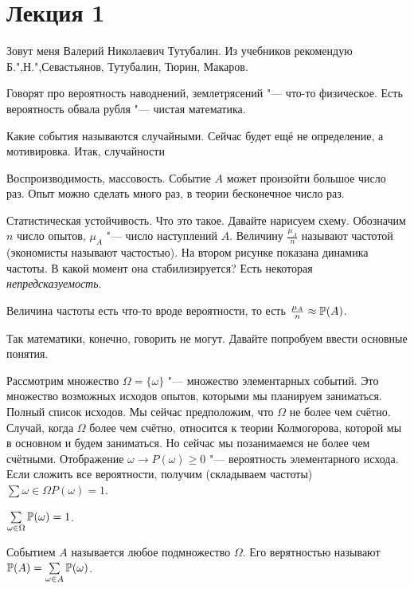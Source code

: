\section{Лекция 1}

Зовут меня Валерий Николаевич Тутубалин. Из учебников рекомендую Б.",Н.",Севастьянов, Тутубалин, Тюрин, Макаров.

Говорят про вероятность наводнений, землетрясений "--- что-то физическое. Есть вероятность обвала рубля "--- чистая математика.

Какие события называются случайными. Сейчас будет ещё не определение, а мотивировка. Итак, случайности
\begin{roItems}
\item Воспроизводимость, массовость. Событие $A$ может произойти большое число раз. Опыт можно сделать много раз, в теории бесконечное число раз.
\item Статистическая устойчивость. Что это такое. Давайте нарисуем схему.
Обозначим $n$ число опытов, $\mu_A$ "--- число наступлений $A$. Величину $\frac{\mu_A}n$ называют частотой (экономисты называют частостью).
На втором рисунке показана динамика частоты. В какой момент она стабилизируется? Есть некоторая \textit{непредсказуемость}.
\end{roItems}
Величина частоты есть что-то вроде вероятности, то есть $\frac{\mu_A}n\approx \P(A)$.

Так математики, конечно, говорить не могут. Давайте попробуем ввести основные понятия.

Рассмотрим множество $\Omega = \{\omega\}$ "--- множество элементарных событий. Это множество возможных исходов опытов, которыми мы планируем заниматься. Полный список исходов. Мы сейчас предположим, что $\Omega$ не более чем счётно. Случай, когда $\Omega$ более чем счётно, относится к теории Колмогорова, которой мы в основном и будем заниматься. Но сейчас мы позанимаемся не более чем счётными. Отображение $\omega\to P(\omega)\ge0$ "--- вероятность элементарного исхода.
 Если сложить все вероятности, получим (складываем частоты) $\sum\limits{\omega\in\Omega} P(\omega) = 1$.

\begin{Aks}
$\sum\limits_{\omega\in\Omega} \P(\omega) = 1$.
\end{Aks}

\begin{Def}
Событием $A$ называется любое подмножество $\Omega$. Его верятностью называют $\P(A) = \sum\limits_{\omega\in A}\P(\omega)$.
\end{Def}

